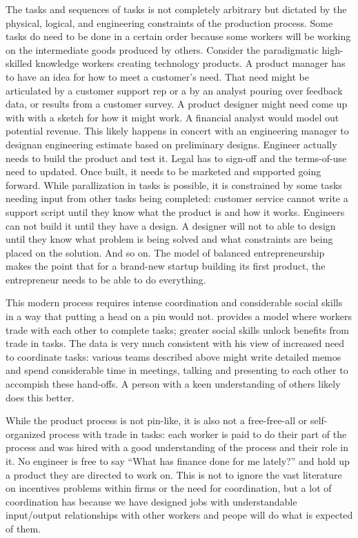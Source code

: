 \documentclass{article}
\theoremstyle{plain}
\theoremstyle{plain}
\begin{document}
The tasks and sequences of tasks is not completely arbitrary but dictated by the physical, logical, and engineering constraints of the production process.
Some tasks do need to be done in a certain order because some workers will be working on the intermediate goods produced by others.  
Consider the paradigmatic high-skilled knowledge workers creating technology products.
A product manager has to have an idea for how to meet a customer's need. 
That need might be articulated by a customer support rep or a by an analyst pouring over feedback data, or results from a customer survey.
A product designer might need come up with with a sketch for how it might work. 
A financial analyst would model out potential revenue. 
This likely happens in concert with an engineering manager to designan engineering estimate based on preliminary designs. 
Engineer actually needs to build the product and test it.  
Legal has to sign-off and the terms-of-use need to updated.
Once built, it needs to be marketed and supported going forward.
While parallization in tasks is possible, it is constrained by some tasks needing input from other tasks being completed: customer service cannot write a support script until they know what the product is and how it works. 
Engineers can not build it until they have a design.
A designer will not to able to design until they know what problem is being solved and what constraints are being placed on the solution.
And so on.
The \cite{lazear2004balanced} model of balanced entrepreneurship makes the point that for a brand-new startup building its first product, the entrepreneur needs to be able to do everything. 

This modern process requires intense coordination and considerable social skills in a way that putting a head on a pin would not. 
\cite{deming2017growing} provides a model where workers trade with each other to complete tasks; greater social skills unlock benefits from trade in tasks.
The data is very much consistent with his view of increased need to coordinate tasks:
various teams described above might write detailed memos and spend considerable time in meetings, talking and presenting to each other to accompish these hand-offs.
A person with a keen understanding of others likely does this better. 

While the product process is not pin-like, it is also not a free-free-all or self-organized process with trade in tasks: 
each worker is paid to do their part of the process and was hired with a good understanding of the process and their role in it. 
No engineer is free to say ``What has finance done for me lately?'' and hold up a product they are directed to work on.
This is not to ignore the vast literature on incentives problems within firms or the need for coordination, but a lot of coordination has because we have designed jobs with understandable input/output relationships with other workers and peope will do what is expected of them.
\end{document}
